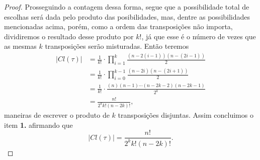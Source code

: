 \begin{proof}
  Prosseguindo a contagem dessa forma, segue que a possibilidade total de escolhas será dada pelo produto das posibilidades, mas, dentre as possibilidades mencionadas acima, porém, como a ordem das transposições não importa, dividiremos o resultado desse produto por $k!$, já que esse é o número de vezes que as mesmas $k$ transposições serão misturadas. Então teremos
  \begin{align*}
    |Cl(\tau)|&=\frac{1}{k!}\cdot \prod_{i=1}^{k}\frac{(n-2(i-1))(n-(2i-1))}{2}\\
    &=\frac{1}{k!}\cdot\prod_{i=0}^{k-1}\frac{(n-2i)(n-(2i+1))}{2}\\
    &=\frac{1}{k!}\cdot\frac{(n)(n-1)\cdots(n-2k-2)(n-2k-1)}{2^{k}}\\
    &=\frac{n!}{2^{k}k!(n-2k)!},
  \end{align*}
  maneiras de escrever o produto de $k$ transposições disjuntas. Assim concluimos o item \textbf{1.} afirmando que
  \begin{equation}\label{eq:clase-tau-lema1}
    |Cl(\tau)|=\frac{n!}{2^{k}k!(n-2k)!}.
  \end{equation}


\end{proof}
